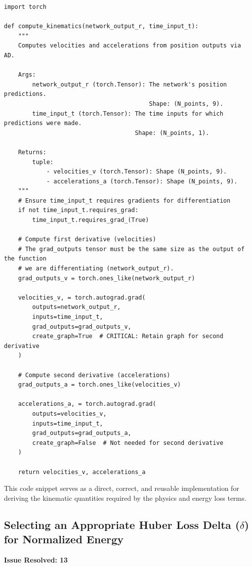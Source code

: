 \documentclass[11pt, a4paper]{article}
\begin{document}
\begin{lstlisting}
import torch

def compute_kinematics(network_output_r, time_input_t):
    """
    Computes velocities and accelerations from position outputs via AD.

    Args:
        network_output_r (torch.Tensor): The network's position predictions.
                                         Shape: (N_points, 9).
        time_input_t (torch.Tensor): The time inputs for which predictions were made.
                                     Shape: (N_points, 1).

    Returns:
        tuple:
            - velocities_v (torch.Tensor): Shape (N_points, 9).
            - accelerations_a (torch.Tensor): Shape (N_points, 9).
    """
    # Ensure time_input_t requires gradients for differentiation
    if not time_input_t.requires_grad:
        time_input_t.requires_grad_(True)

    # Compute first derivative (velocities)
    # The grad_outputs tensor must be the same size as the output of the function
    # we are differentiating (network_output_r).
    grad_outputs_v = torch.ones_like(network_output_r)

    velocities_v, = torch.autograd.grad(
        outputs=network_output_r,
        inputs=time_input_t,
        grad_outputs=grad_outputs_v,
        create_graph=True  # CRITICAL: Retain graph for second derivative
    )

    # Compute second derivative (accelerations)
    grad_outputs_a = torch.ones_like(velocities_v)

    accelerations_a, = torch.autograd.grad(
        outputs=velocities_v,
        inputs=time_input_t,
        grad_outputs=grad_outputs_a,
        create_graph=False  # Not needed for second derivative
    )

    return velocities_v, accelerations_a
\end{lstlisting}
This code snippet serves as a direct, correct, and reusable implementation for deriving the kinematic quantities required by the physics and energy loss terms.

\subsection{Selecting an Appropriate Huber Loss Delta (\texorpdfstring{$\delta$}{delta}) for Normalized Energy}
\textbf{Issue Resolved: 13}
\end{document}
